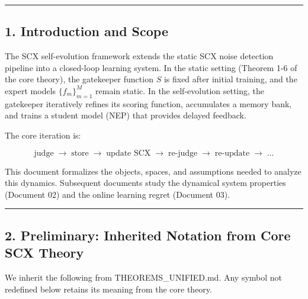 \documentclass[
  12pt,
]{article}
\begin{document}
\begin{center}\rule{0.5\linewidth}{0.5pt}\end{center}

\subsection{1. Introduction and Scope}\label{introduction-and-scope}

The SCX self-evolution framework extends the static SCX noise detection
pipeline into a closed-loop learning system. In the static setting
(Theorem 1-6 of the core theory), the gatekeeper function \(S\) is fixed
after initial training, and the expert models \(\{f_m\}_{m=1}^M\) remain
static. In the self-evolution setting, the gatekeeper iteratively
refines its scoring function, accumulates a memory bank, and trains a
student model (NEP) that provides delayed feedback.

The core iteration is:

\[\text{judge} \;\to\; \text{store} \;\to\; \text{update SCX} \;\to\; \text{re-judge} \;\to\; \text{re-update} \;\to\; \dots\]

This document formalizes the objects, spaces, and assumptions needed to
analyze this dynamics. Subsequent documents study the dynamical system
properties (Document 02) and the online learning regret (Document 03).

\begin{center}\rule{0.5\linewidth}{0.5pt}\end{center}

\subsection{2. Preliminary: Inherited Notation from Core SCX
Theory}\label{preliminary-inherited-notation-from-core-scx-theory}

We inherit the following from THEOREMS\_UNIFIED.md. Any symbol not
redefined below retains its meaning from the core theory.
\end{document}
